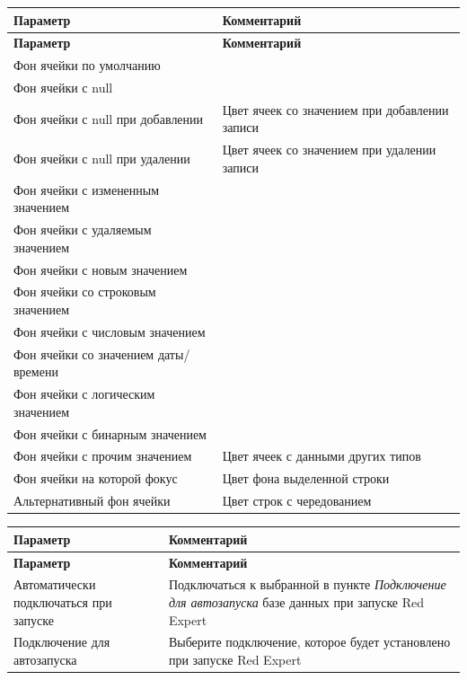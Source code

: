 \begin{longtable}[r]{|>{\ttfamily}m{6cm}|m{9.5cm}|}
	\hline
	\centering\normalfont\bfseries Параметр &
	\centering\arraybslash\bfseries Комментарий\\\hline
	\endfirsthead
	\hline
	\centering\normalfont\bfseries Параметр &
	\centering\arraybslash\bfseries Комментарий\\\hline
	\endhead
	\hline
	Фон ячейки по умолчанию &  \\\hline
	Фон ячейки с null & \\\hline
	Фон ячейки с null при добавлении & Цвет ячеек со значением \ttt{NULL} при добавлении записи \\\hline
	Фон ячейки с null при удалении & Цвет ячеек со значением \ttt{NULL} при удалении записи \\\hline
	Фон ячейки с измененным значением &  \\\hline
	Фон ячейки с удаляемым значением &  \\\hline
	Фон ячейки с новым значением &   \\\hline
	Фон ячейки со строковым значением &  \\\hline
	Фон ячейки с числовым значением &  \\\hline
	Фон ячейки со значением даты/времени & \\\hline
	Фон ячейки с логическим значением & \\\hline
	Фон ячейки с бинарным значением &   \\\hline
	Фон ячейки с прочим значением & Цвет ячеек с данными других типов \\\hline
	Фон ячейки на которой фокус & Цвет фона выделенной строки \\\hline
	Альтернативный фон ячейки & Цвет строк с чередованием \\\hline
\end{longtable}


\begin{longtable}[r]{|>{\ttfamily}m{5cm}|m{10.5cm}|}
	\hline
	\centering\normalfont\bfseries Параметр &
	\centering\arraybslash\bfseries Комментарий\\\hline
	\endfirsthead
	\hline
	\centering\normalfont\bfseries Параметр &
	\centering\arraybslash\bfseries Комментарий\\\hline
	\endhead
	\hline
	Автоматически подключаться при запуске & Подключаться к выбранной в пункте \textit{Подключение для автозапуска} базе данных при запуске Red Expert\\\hline
	Подключение для автозапуска &  Выберите подключение, которое будет установлено при запуске Red Expert\\\hline
\end{longtable}

